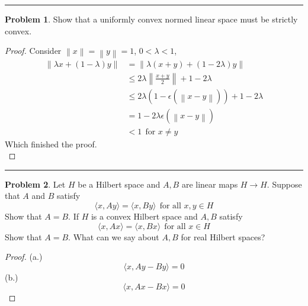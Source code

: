 \documentclass[a4paper, 10pt]{article}
\theoremstyle{definition}
\newtheorem{problem}{Problem}
\theoremstyle{hSol}
\begin{document}
\noindent\rule{16cm}{0.4pt}
\begin{problem} Show that a uniformly convex normed linear space must be strictly convex.
\end{problem}
\begin{proof} Consider $\left\|x\right\|=\left\|y\right\|=1$, $0< \lambda <1$,
\begin{equation}
	\begin{split}
		\left\|\lambda x + (1- \lambda)y\right\| &= \left\|\lambda(x+y)+(1-2 \lambda)y\right\| \\
		&\leq 2 \lambda \left\|\frac{x+y}{2}\right\| + 1-2 \lambda \\
		&\leq 2 \lambda (1- \epsilon(\left\|x-y\right\|)) + 1-2 \lambda \\
		&= 1- 2 \lambda \epsilon(\left\|x-y\right\|) \\
		&<1~~\text{for $x\ne y$}
	\end{split}
\end{equation}
Which finished the proof.\\
\end{proof}

\noindent\rule{16cm}{0.4pt}
\begin{problem} Let $H$ be a Hilbert space and $A, B$ are linear maps $H \to H$. Suppose that $A$ and $B$ satisfy
$$\langle x, Ay \rangle = \langle x, By \rangle~~\text{for all $x,y\in H$}$$
Show that $A=B$. If $H$ is a convex Hilbert space and $A,B$ satisfy
$$\langle x, Ax \rangle = \langle x, Bx \rangle~~\text{for all $x\in H$}$$
Show that $A=B$. What can we say about $A, B$ for real Hilbert spaces?
\end{problem}
\begin{proof} (a.)
$$\langle x,Ay-By \rangle =0$$
(b.)
$$\langle x, Ax-Bx \rangle = 0$$
\end{proof}
\end{document}
